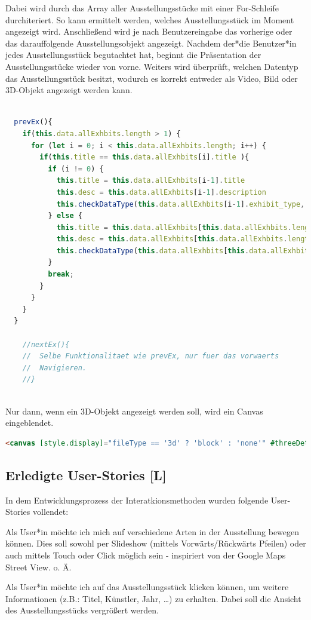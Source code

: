 Dabei wird durch das Array aller Ausstellungsstücke mit einer For-Schleife durchiteriert. So kann ermittelt werden, welches Ausstellungsstück im Moment angezeigt wird. Anschließend wird je nach Benutzereingabe das vorherige oder das darauffolgende Ausstellungsobjekt angezeigt. Nachdem der*die Benutzer*in jedes Ausstellungsstück begutachtet hat, beginnt die Präsentation der Ausstellungsstücke wieder von vorne. Weiters wird überprüft, welchen Datentyp das Ausstellungsstück besitzt, wodurch es korrekt entweder als Video, Bild oder 3D-Objekt angezeigt werden kann.

\begin{lstlisting}[caption={Funktionen für das Navigieren durch die Ausstellung},language=TypeScript]

  prevEx(){
    if(this.data.allExhbits.length > 1) {
      for (let i = 0; i < this.data.allExhbits.length; i++) {
        if(this.title == this.data.allExhbits[i].title ){
          if (i != 0) {
            this.title = this.data.allExhbits[i-1].title
            this.desc = this.data.allExhbits[i-1].description
            this.checkDataType(this.data.allExhbits[i-1].exhibit_type, this.data.allExhbits[i-1].exhibit_url)
          } else {
            this.title = this.data.allExhbits[this.data.allExhbits.length-1].title
            this.desc = this.data.allExhbits[this.data.allExhbits.length-1].description
            this.checkDataType(this.data.allExhbits[this.data.allExhbits.length-1].exhibit_type, this.data.allExhbits[this.data.allExhbits.length-1].exhibit_url)
          }
          break;
        }
      }
    }
  }
  
    //nextEx(){
    //  Selbe Funktionalitaet wie prevEx, nur fuer das vorwaerts 
    //  Navigieren.
    //}
 
\end{lstlisting}

Nur dann, wenn ein 3D-Objekt angezeigt werden soll, wird ein Canvas eingeblendet.

\begin{lstlisting}[caption={Canvas anzeigen und ausblenden},language=HTML]
<canvas [style.display]="fileType == '3d' ? 'block' : 'none'" #threeDetailCanvas class="detail"></canvas>
\end{lstlisting}

\subsection{Erledigte User-Stories [L]}
In dem Entwicklungsprozess der Interatkionsmethoden wurden folgende User-Stories vollendet:

\begin{compactenum}       
  \item Als User*in möchte ich mich auf verschiedene Arten in der Ausstellung bewegen können. Dies soll sowohl per Slideshow (mittels Vorwärts/Rückwärts Pfeilen) oder auch mittels Touch oder Click möglich sein - inspiriert von der Google Maps Street View. o. Ä.
  \item  Als User*in möchte ich auf das Ausstellungsstück klicken können, um weitere Informationen (z.B.: Titel, Künstler, Jahr, …) zu erhalten. Dabei soll die Ansicht des Ausstellungsstücks vergrößert werden.
\end{compactenum}